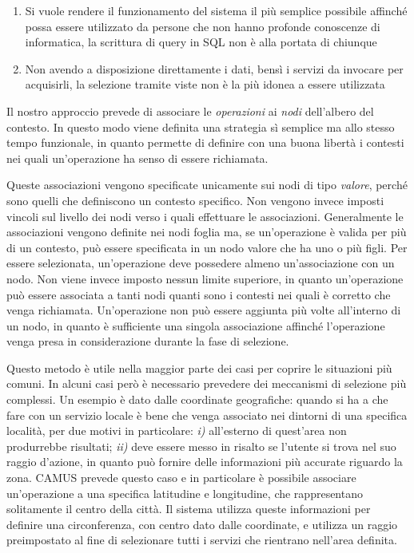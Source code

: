 \begin{enumerate}
	\item Si vuole rendere il funzionamento del sistema il più semplice possibile affinché possa essere utilizzato da persone che non hanno profonde conoscenze di informatica, la scrittura di query in SQL non è alla portata di chiunque
	\item Non avendo a disposizione direttamente i dati, bensì i servizi da invocare per acquisirli, la selezione tramite viste non è la più idonea a essere utilizzata
\end{enumerate}

Il nostro approccio prevede di associare le \emph{operazioni} ai \emph{nodi} dell'albero del contesto. In questo modo viene definita una strategia sì semplice ma allo stesso tempo funzionale, in quanto permette di definire con una buona libertà i contesti nei quali un'operazione ha senso di essere richiamata.

Queste associazioni vengono specificate unicamente sui nodi di tipo \emph{valore}, perché sono quelli che definiscono un contesto specifico. Non vengono invece imposti vincoli sul livello dei nodi verso i quali effettuare le associazioni. Generalmente le associazioni vengono definite nei nodi foglia ma, se un'operazione è valida per più di un contesto, può essere specificata in un nodo valore che ha uno o più figli. Per essere selezionata, un'operazione deve possedere almeno un'associazione con un nodo. Non viene invece imposto nessun limite superiore, in quanto un'operazione può essere associata a tanti nodi quanti sono i contesti nei quali è corretto che venga richiamata. Un'operazione non può essere aggiunta più volte all'interno di un nodo, in quanto è sufficiente una singola associazione affinché l'operazione venga presa in considerazione durante la fase di selezione.

Questo metodo è utile nella maggior parte dei casi per coprire le situazioni più comuni. In alcuni casi però è necessario prevedere dei meccanismi di selezione più complessi. Un esempio è dato dalle coordinate geografiche: quando si ha a che fare con un servizio locale è bene che venga associato nei dintorni di una specifica località, per due motivi in particolare: \emph{i)} all'esterno di quest'area non produrrebbe risultati; \emph{ii)} deve essere messo in risalto se l'utente si trova nel suo raggio d'azione, in quanto può fornire delle informazioni più accurate riguardo la zona. CAMUS prevede questo caso e in particolare è possibile associare un'operazione a una specifica latitudine e longitudine, che rappresentano solitamente il centro della città. Il sistema utilizza queste informazioni per definire una circonferenza, con centro dato dalle coordinate, e utilizza un raggio preimpostato al fine di selezionare tutti i servizi che rientrano nell'area definita.

